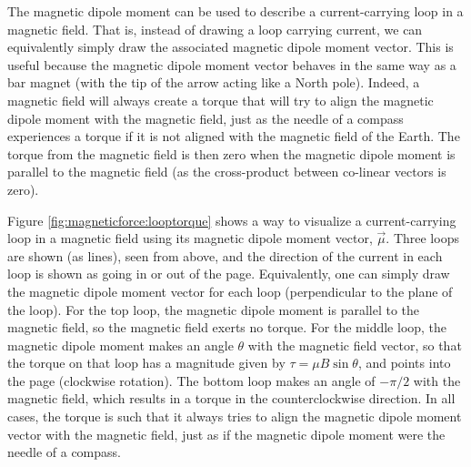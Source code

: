 The magnetic dipole moment can be used to describe a current-carrying loop in a magnetic field. That is, instead of drawing a loop carrying current, we can equivalently simply draw the associated magnetic dipole moment vector. This is useful because the magnetic dipole moment vector behaves in the same way as a bar magnet (with the tip of the arrow acting like a North pole). Indeed, a magnetic field will always create a torque that will try to align the magnetic dipole moment with the magnetic field, just as the needle of a compass experiences a torque if it is not aligned with the magnetic field of the Earth. The torque from the magnetic field is then zero when the magnetic dipole moment is parallel to the magnetic field (as the cross-product between co-linear vectors is zero). 

Figure \ref{fig:magneticforce:looptorque} shows a way to visualize a current-carrying loop in a magnetic field using its magnetic dipole moment vector, $\vec \mu$.  
Three loops are shown (as lines), seen from above, and the direction of the current in each loop is shown as going in or out of the page. Equivalently, one can simply draw the magnetic dipole moment vector for each loop (perpendicular to the plane of the loop). For the top loop, the magnetic dipole moment is parallel to the magnetic field, so the magnetic field exerts no torque. For the middle loop, the magnetic dipole moment makes an angle $\theta$ with the magnetic field vector, so that the torque on that loop has a magnitude given by $\tau=\mu B \sin\theta$, and points into the page (clockwise rotation). The bottom loop makes an angle of $-\pi/2$ with the magnetic field, which results in a torque in the counterclockwise direction. In all cases, the torque is such that it always tries to align the magnetic dipole moment vector with the magnetic field, just as if the magnetic dipole moment were the needle of a compass. 
\newpage
